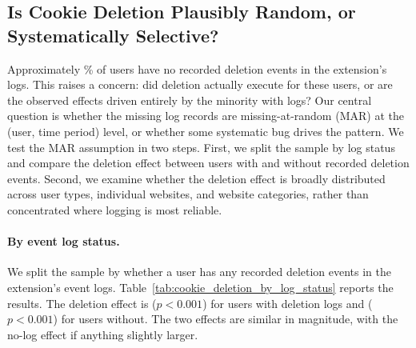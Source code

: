 \documentclass[12pt]{article}
\theoremstyle{definition}
\theoremstyle{remark}
\begin{document}
\begin{appendix}
\subsection{Is Cookie Deletion Plausibly Random, or Systematically Selective?}\label{subsec:deletion_plausibly_random}

Approximately \noLogPct{}\% of users have no recorded deletion events in the extension's logs. This raises a concern: did deletion actually execute for these users, or are the observed effects driven entirely by the minority with logs? Our central question is whether the missing log records are missing-at-random (MAR) at the (user, time period) level, or whether some systematic bug drives the pattern. We test the MAR assumption in two steps. First, we split the sample by log status and compare the deletion effect between users with and without recorded deletion events. Second, we examine whether the deletion effect is broadly distributed across user types, individual websites, and website categories, rather than concentrated where logging is most reliable.

\paragraph{By event log status.} We split the sample by whether a user has any recorded deletion events in the extension's event logs. Table~\ref{tab:cookie_deletion_by_log_status} reports the results. The deletion effect is \cookieHasLogCoef{} ($p < 0.001$) for users with deletion logs and \cookieNoLogCoef{} ($p < 0.001$) for users without. The two effects are similar in magnitude, with the no-log effect if anything slightly larger.

\begin{table}[H]
\centering
\caption{Cookie Deletion Effect by Event Log Status}
\label{tab:cookie_deletion_by_log_status}
\scalebox{0.9}{

}
\caption*{\scriptsize \textsc{Notes}: This table reports the cookie deletion difference-in-differences estimate separately for the full sample, users with recorded deletion events in the event logs, and users without. The dependent variable is $\log(1 + \text{daily CPV})$. All specifications include user, website, and day-of-week fixed effects. Standard errors are clustered at the user level.}
\end{table}


\end{appendix}
\end{document}
